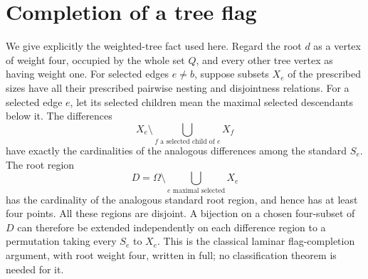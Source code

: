 \section{Completion of a tree flag}\label{sec:regularity}
We give explicitly the weighted-tree fact used here. Regard the root
$d$ as a vertex of weight four, occupied by the whole set $Q$, and every
other tree vertex as having weight one. For selected edges $e\ne b$,
suppose subsets $X_e$ of the prescribed sizes have all their prescribed
pairwise nesting and disjointness relations. For a selected edge $e$,
let its selected children mean the maximal selected descendants below it.
The differences
\[
 X_e\setminus\bigcup_{f\text{ a selected child of }e}X_f
\]
have exactly the cardinalities of the analogous differences among the
standard $S_e$. The root region
\[
 D=\Omega\setminus\bigcup_{e\text{ maximal selected}}X_e
\]
has the cardinality of the analogous standard root region, and hence
has at least four points. All these regions are disjoint. A bijection
on a chosen four-subset of $D$ can therefore be extended independently
on each difference region to a permutation taking every $S_e$ to $X_e$.
This is the classical laminar flag-completion argument, with root
weight four, written in full; no classification theorem is needed for it.

